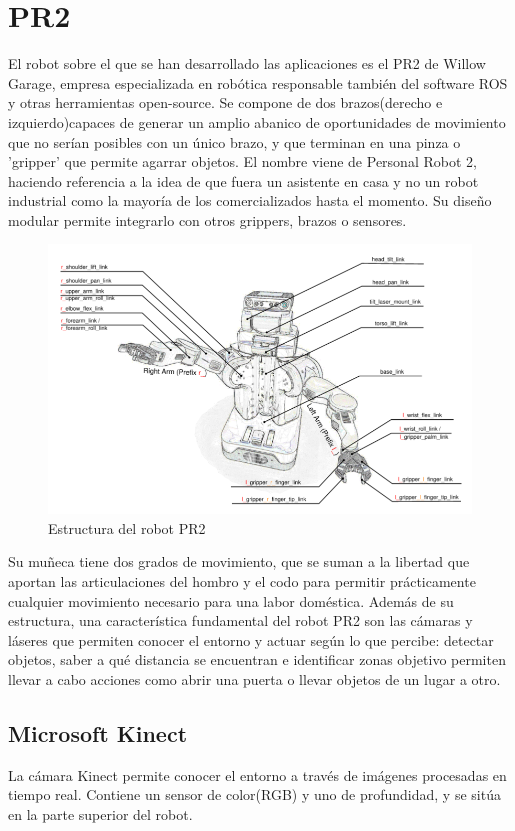 \documentclass[12pt,spanish,chapterprefix, numbers=noenddot]{book}
\numberwithin{equation}{section}
\numberwithin{figure}{section}
\begin{document}
\section{PR2}
El robot sobre el que se han desarrollado las aplicaciones es el PR2 de Willow Garage, empresa especializada en robótica responsable también del software ROS y otras herramientas open-source. Se compone de dos brazos(derecho e izquierdo)capaces de generar un amplio abanico de oportunidades de movimiento que no serían posibles con un único brazo, y que terminan en una pinza o 'gripper' que permite agarrar objetos. El nombre viene de Personal Robot 2, haciendo referencia a la idea de que fuera un asistente en casa y no un robot industrial como la mayoría de los comercializados hasta el momento.
Su diseño modular permite integrarlo con otros grippers, brazos o sensores.
\begin{figure}[hbt!]
\centering
\includegraphics[width=12cm]{Figs/PR2_structure.png}
\par
\caption{\label{fig:pr2Structure}Estructura del robot PR2}
\end{figure}
Su muñeca tiene dos grados de movimiento, que se suman a la libertad que aportan las articulaciones del hombro y el codo para permitir prácticamente cualquier movimiento necesario para una labor doméstica.
Además de su estructura, una característica fundamental del robot PR2 son las cámaras y láseres que permiten conocer el entorno y actuar según lo que percibe: detectar objetos, saber a qué distancia se encuentran e identificar zonas objetivo permiten llevar a cabo acciones como abrir una puerta o llevar objetos de un lugar a otro.
\subsection{Microsoft Kinect}
La cámara Kinect permite conocer el entorno a través de imágenes procesadas en tiempo real. 
Contiene un sensor de color(RGB) y uno de profundidad, y se sitúa en la parte superior del robot. 
\end{document}
